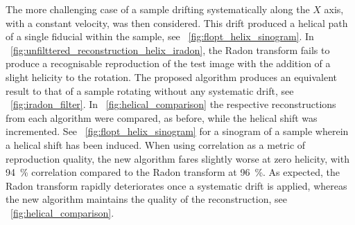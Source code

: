 \documentclass{osa-article}
\begin{document}

The more challenging case of a sample drifting systematically along the \(X\) axis, with a constant velocity, was then considered. This drift produced a helical path of a single fiducial within the sample, see \figurename~\ref{fig:flopt_helix_sinogram}.
In \figurename~\ref{fig:unfilttered_reconstruction_helix_iradon}, the Radon transform fails to produce a recognisable reproduction of the test image with the addition of a slight helicity to the rotation.
The proposed algorithm produces an equivalent result to that of a sample rotating without any systematic drift, see \figurename~\ref{fig:iradon_filter}.
In \figurename~\ref{fig:helical_comparison} the respective reconstructions from each algorithm were compared, as before, while the helical shift was incremented.
See \figurename~\ref{fig:flopt_helix_sinogram} for a sinogram of a sample wherein a helical shift has been induced.
When using correlation as a metric of reproduction quality, the new algorithm fares slightly worse at zero helicity, with \SI{94}{\percent} correlation compared to the Radon transform at \SI{96}{\percent}.
As expected, the Radon transform rapidly deteriorates once a systematic drift is applied, whereas the new algorithm maintains the quality of the reconstruction, see \figurename~\ref{fig:helical_comparison}.
\end{document}
